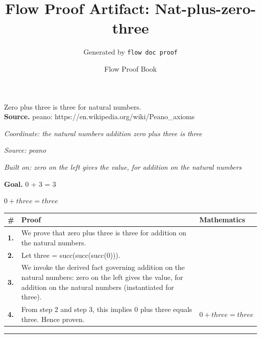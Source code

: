 \documentclass[11pt]{article}
\title{Flow Proof Artifact: Nat-plus-zero-three}
\author{Generated by \texttt{flow doc proof}}
\date{Flow Proof Book}
\theoremstyle{definition}
\begin{document}
\maketitle
Zero plus three is three for natural numbers.\\[0.5em]
\textbf{Source.} peano: https://en.wikipedia.org/wiki/Peano\_axioms\\[0.5em]
\bigskip
{}\par
\smallskip\noindent\textit{Coordinate: the natural numbers \cdot addition \cdot zero plus three is three}\par
\smallskip\noindent\textit{Source: peano}\par
\smallskip\noindent\textit{Built on: zero on the left gives the value, for addition on the natural numbers}\par
\medskip
\noindent\textbf{Goal.} 0 + 3 = 3\par
\noindent$\displaystyle 0 + three = three$\par
\medskip
\noindent
\begin{tabular}{@{} >{\raggedright\arraybackslash}p{} >{\raggedright\arraybackslash}p{} >{\raggedleft\arraybackslash}p{} @{}}
\textbf{\#} & \textbf{Proof} & \textbf{Mathematics} \\
\midrule
\textbf{1.} & We prove that zero plus three is three for addition on the natural numbers. & \\[0.45em]
\textbf{2.} & Let three = succ(succ(succ(0))). & \\[0.45em]
\textbf{3.} & We invoke the derived fact governing addition on the natural numbers: zero on the left gives the value, for addition on the natural numbers (instantiated for three). & \\[0.45em]
\textbf{4.} & From step 2 and step 3, this implies 0 plus three equals three. Hence proven. & $\displaystyle 0 + three = three$ \\[0.45em]
\bottomrule
\end{tabular}
\label{thm:Nat-addition-zero_plus_three_is_three}
\par\medskip\hrule
\end{document}
